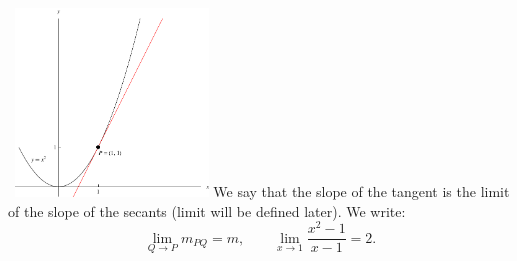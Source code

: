 \begin{frame}
\begin{columns}[c]
\  \includegraphics[height=5cm]{limits/pictures/02-01-secanta.pdf}%
We say that the slope of the tangent is the limit of the slope of the secants (limit will be defined later).  We write:
\[
\lim_{Q\rightarrow P} m_{PQ} = m, \qquad \lim_{x\rightarrow 1}\frac{x^2 - 1}{x - 1} = 2 .
\]
\end{columns}
\end{frame}
